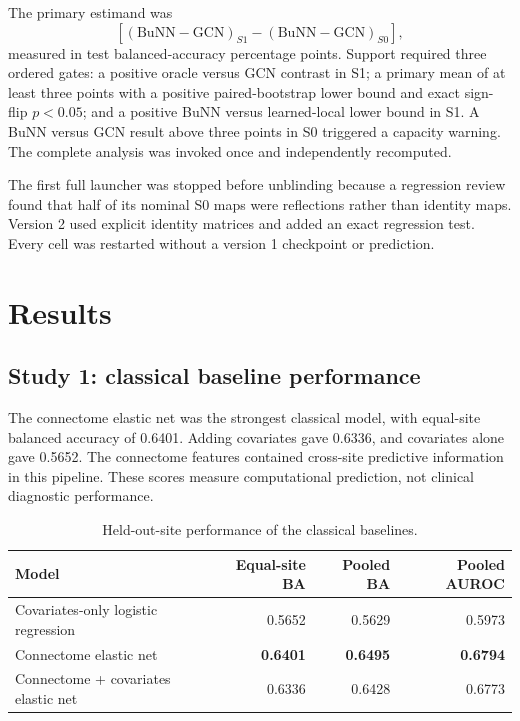 \documentclass[11pt,a4paper]{article}
\begin{document}
The primary estimand was
\[
[(\mathrm{BuNN}-\mathrm{GCN})_{S1}-(\mathrm{BuNN}-\mathrm{GCN})_{S0}],
\]
measured in test balanced-accuracy percentage points. Support required three
ordered gates: a positive oracle versus GCN contrast in S1; a primary mean of
at least three points with a positive paired-bootstrap lower bound and exact
sign-flip $p<0.05$; and a positive BuNN versus learned-local lower bound in S1.
A BuNN versus GCN result above three points in S0 triggered a capacity warning.
The complete analysis was invoked once and independently recomputed.

The first full launcher was stopped before unblinding because a regression
review found that half of its nominal S0 maps were reflections rather than
identity maps. Version 2 used explicit identity matrices and added an exact
regression test. Every cell was restarted without a version 1 checkpoint or
prediction.

\section{Results}

\subsection{Study 1: classical baseline performance}

The connectome elastic net was the strongest classical model, with equal-site
balanced accuracy of 0.6401. Adding covariates gave 0.6336, and covariates alone
gave 0.5652. The connectome features contained cross-site predictive
information in this pipeline. These scores measure computational prediction,
not clinical diagnostic performance.

\begin{table}[htbp]
\centering
\caption{Held-out-site performance of the classical baselines.}
\label{tab:baselines}
\begin{tabularx}{\textwidth}{@{}Y r r r@{}}
\toprule
\textbf{Model} & \textbf{Equal-site BA} & \textbf{Pooled BA} & \textbf{Pooled AUROC} \\
\midrule
Covariates-only logistic regression & 0.5652 & 0.5629 & 0.5973 \\
Connectome elastic net & \textbf{0.6401} & \textbf{0.6495} & \textbf{0.6794} \\
Connectome + covariates elastic net & 0.6336 & 0.6428 & 0.6773 \\
\bottomrule
\end{tabularx}
\end{table}
\end{document}
